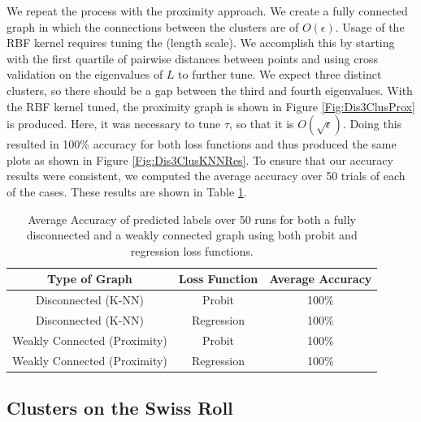 \documentclass[12pt]{amsart}
\begin{document}
We repeat the process with the proximity approach. We create a fully connected graph in which the connections between the clusters are of $O(\epsilon)$. Usage of the RBF kernel requires tuning the (length scale). We accomplish this by starting with the first quartile of pairwise distances between points and using cross validation on the eigenvalues of $L$ to further tune. We expect three distinct clusters, so there should be a gap between the third and fourth eigenvalues. With the RBF kernel tuned, the proximity graph is shown in Figure \ref{Fig:Dis3ClusProx} is produced. Here, it was necessary to tune $\tau$, so that it is $O(\sqrt{\epsilon})$. Doing this resulted in 100\% accuracy for both loss functions and thus produced the same plots as shown in Figure \ref{Fig:Dis3ClusKNNRes}. To ensure that our accuracy results were consistent, we computed the average accuracy over 50 trials of each of the cases. These results are shown in Table \ref{Table:3ClusRes}.

\begin{table}
\begin{center}
\begin{tabular}{||c c c||} 
 \hline
 Type of Graph & Loss Function & Average Accuracy\\  
 \hline\hline
 Disconnected (K-NN) & Probit & 100\% \\ 
 \hline
 Disconnected (K-NN) & Regression & 100\% \\
 \hline
 Weakly Connected (Proximity) & Probit & 100\% \\
 \hline
 Weakly Connected (Proximity) & Regression & 100\% \\ 
 \hline
\end{tabular}
\caption{Average Accuracy of predicted labels over 50 runs for both a fully disconnected and a weakly connected graph using both probit and regression loss functions.}
\label{Table:3ClusRes}
\end{center}
\end{table}

\subsection{Clusters on the Swiss Roll}
\end{document}
